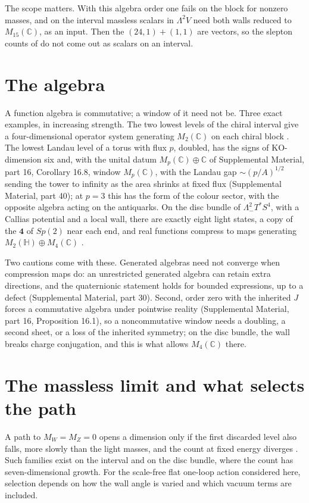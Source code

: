 \documentclass[aps,prd,reprint,onecolumn,nofootinbib,amsmath,amssymb,floatfix]{revtex4-2}
\theoremstyle{plain}
\newcommand{\C}{\mathbb C}
\renewcommand{\H}{\mathbb H}
\newcommand{\supp}[1]{Supplemental Material, part #1}
\begin{document}
The scope matters. With this algebra order one fails on the block for nonzero masses, and on the interval massless scalars in $\Lambda^2V$ need both walls reduced to $M_{15}(\C)$, as an input. Then the $(24,1)+(1,1)$ are vectors, so the slepton counts of \cite{Rivero2005} do not come out as scalars on an interval.

\section{The algebra}

A function algebra is commutative; a window of it need not be. Three exact examples, in increasing strength. The two lowest levels of the chiral interval give a four-dimensional operator system generating $M_2(\C)$ on each chiral block \cite{towerlesspaper}. The lowest Landau level of a torus with flux $p$, doubled, has the signs of KO-dimension six and, with the unital datum $M_p(\C)\oplus\C$ of \supp{16}, Corollary 16.8, window $M_p(\C)$, with the Landau gap $\sim(p/A)^{1/2}$ sending the tower to infinity as the area shrinks at fixed flux (\supp{40}); at $p=3$ this has the form of the colour sector, with the opposite algebra acting on the antiquarks. On the disc bundle of $\Lambda^2_-T^*S^4$, with a Callias potential and a local wall, there are exactly eight light states, a copy of the $\mathbf 4$ of $Sp(2)$ near each end, and real functions compress to maps generating $M_2(\H)\oplus M_4(\C)$ \cite{jointnote}.

Two cautions come with these. Generated algebras need not converge when compression maps do: an unrestricted generated algebra can retain extra directions, and the quaternionic statement holds for bounded expressions, up to a defect (\supp{30}). Second, order zero with the inherited $J$ forces a commutative algebra under pointwise reality (\supp{16}, Proposition 16.1), so a noncommutative window needs a doubling, a second sheet, or a loss of the inherited symmetry; on the disc bundle, the wall breaks charge conjugation, and this is what allows $M_4(\C)$ there.

\section{The massless limit and what selects the path}\label{sec:path}

A path to $M_W=M_Z=0$ opens a dimension only if the first discarded level also falls, more slowly than the light masses, and the count at fixed energy diverges \cite{jointnote}. Such families exist on the interval and on the disc bundle, where the count has seven-dimensional growth. For the scale-free flat one-loop action considered here, selection depends on how the wall angle is varied and which vacuum terms are included.
\end{document}
